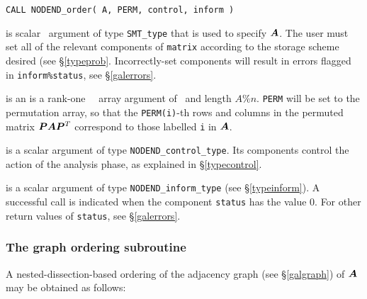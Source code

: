 \documentclass{galahad}
\newcommand{\packagename}{NODEND}
\begin{document}
\hskip0.5in
{\tt CALL \packagename\_order( A, PERM, control, inform )}
\begin{description}
 is scalar \intentin\ argument of type {\tt SMT\_type}
that is used to specify ${\bm{A}}$.
The user must set all of the relevant components of {\tt matrix} according
to the storage scheme desired (see \S\ref{typeprob}.
Incorrectly-set components will result in errors
flagged in {\tt inform\%status}, see \S\ref{galerrors}.

 is an 
 is a rank-one \integer\ \intentout\ array argument
of \intentout\ and length $A\%n$.
{\tt PERM} will be set to the permutation array, so that the 
{\tt PERM(i)}-th rows and columns in the permuted matrix 
${\bm{P}} {\bm{A}} {\bm{P}}^T$ correspond to those labelled {\tt i} in ${\bm{A}}$.

 is a scalar \intentout argument of type
{\tt \packagename\_control\_type}. Its components control the action
of the analysis phase, as explained in
\S\ref{typecontrol}.

 is a scalar \intentout argument of type
{\tt \packagename\_inform\_type}
(see \S\ref{typeinform}).
A successful call is indicated when the  component {\tt status} has the value 0.
For other return values of {\tt status}, see \S\ref{galerrors}.

\end{description}

\subsubsection{The graph ordering subroutine}\label{subgraphorder}
A nested-dissection-based ordering of the adjacency graph (see 
\S\ref{galgraph}) of ${\bm{A}}$ may be obtained as follows:
\vskip2mm
\end{document}
